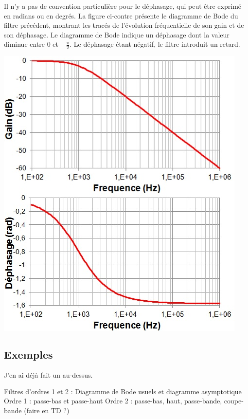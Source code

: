 \documentclass[]{report}
\begin{document}
	\begin{minipage}[l]{0.4\linewidth}
		Il n'y a pas de convention particulière pour le déphasage, qui peut être exprimé en radians ou en degrés. La figure ci-contre présente le diagramme de Bode du filtre précédent, montrant les tracés de l'évolution fréquentielle de son gain et de son déphasage. Le diagramme de Bode indique un déphasage dont la valeur diminue entre 0 et $-\frac{\pi}{2}$. Le déphasage étant négatif, le filtre introduit un retard.	
	\end{minipage} \hfill
	\begin{minipage}[c]{0.50\linewidth}
			\includegraphics[scale=0.6]{images/Bode_passe-bas.jpg}
	\end{minipage}
	
	
	
	\subsection{Exemples}
	J'en ai déjà fait un au-dessus.
	
	Filtres d'ordres 1 et 2 : Diagramme de Bode usuels et diagramme asymptotique
	Ordre 1 : passe-bas et passe-haut
	Ordre 2 : passe-bas, haut, passe-bande, coupe-bande (faire en TD ?)
	
\end{document}
